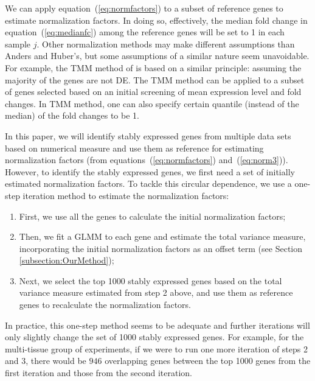 \documentclass[letterpaper,12pt]{article}
\begin{document}

We can apply equation~(\ref{eq:normfactors}) to a subset of reference genes to
estimate normalization factors.  In doing so,  effectively, the median fold
change in equation~(\ref{eq:medianfc}) among the reference genes will be set
to 1 in each sample $j$.
Other normalization methods may make different assumptions
than Anders and Huber's, but some assumptions of a similar nature seem
unavoidable.  For example, the TMM method of \citet{robinson2010scaling} is
based on a similar principle: assuming the majority of the genes are not DE.
The TMM method can be applied to a subset of genes selected based on an
initial screening of mean expression level and fold changes. In TMM method,
one can also specify certain quantile (instead of the median) of the fold
changes to be 1.

In this paper, we will identify stably expressed genes from multiple data sets
based on numerical measure and use them as reference for estimating
normalization factors (from equations~(\ref{eq:normfactors}) and~(\ref{eq:norm3})). 
However, to identify the stably expressed genes, we first
need a set
of initially estimated normalization factors.  To tackle this circular
dependence, we use a one-step iteration method to estimate the normalization
factors: 
\begin{enumerate}
    \item
	First, we use all the genes to calculate the initial normalization factors; 
    \item
	Then, we fit a GLMM to each gene and estimate the total variance measure, incorporating the initial normalization factors as
	an offset term (see Section \ref{subsection:OurMethod}); 
    \item
	Next, we select the top 1000 stably expressed genes based on the total
	variance measure estimated from step 2 above, and use them as
	reference genes to recalculate the normalization factors. 
\end{enumerate}
In practice, this one-step method seems to be adequate and further iterations
will only slightly change the set of 1000 stably expressed genes.  For
example, for the multi-tissue group of experiments, if we were to run one more
iteration of steps 2 and 3, there would be $946$ overlapping genes between
the top 1000 genes from the first iteration and those from the second
iteration.
\end{document}
